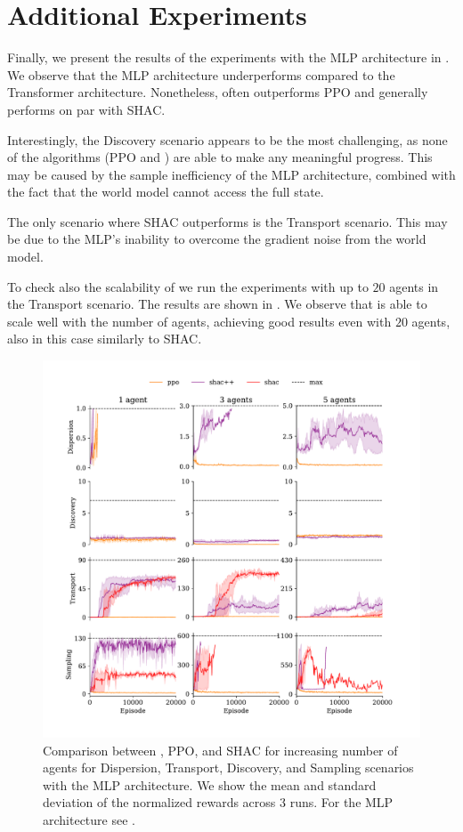 \section{Additional Experiments}\label{apx:experiments}

Finally, we present the results of the experiments with the MLP architecture in . We observe that the MLP architecture underperforms compared to the Transformer architecture. Nonetheless, \fname{} often outperforms PPO and generally performs on par with SHAC.

Interestingly, the Discovery scenario appears to be the most challenging, as none of the algorithms (PPO and \fname{}) are able to make any meaningful progress. This may be caused by the sample inefficiency of the MLP architecture, combined with the fact that the world model cannot access the full state.

The only scenario where SHAC outperforms \fname{} is the Transport scenario. This may be due to the MLP's inability to overcome the gradient noise from the world model.

To check also the scalability of \fname{} we run the experiments with up to $20$ agents in the Transport scenario. The results are shown in . We observe that \fname{} is able to scale well with the number of agents, achieving good results even with $20$ agents, also in this case similarly to SHAC.
\begin{figure}[t]
    \centering
    \includegraphics[width=\columnwidth]{figs/main-mlp.pdf}
    \caption{Comparison between \fname{}, PPO, and SHAC for increasing number of agents for Dispersion, Transport, Discovery, and Sampling scenarios with the MLP architecture.
    We show the mean and standard deviation of the normalized rewards across $3$ runs. For the MLP architecture see .
    }\vspace{0.5cm}
    \label{apx:fig:experiments-mlp}
\end{figure}

